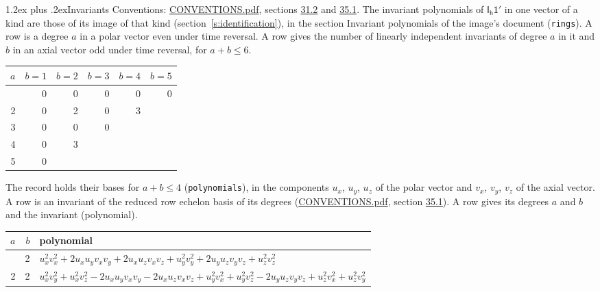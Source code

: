 \documentclass[10pt,a4paper]{article}
\makeatletter
\renewcommand\section{\@startsection{section}{1}{\z@}{-3ex plus -1ex minus -.2ex}%
  {1.2ex plus .2ex}{\normalfont\large\sffamily\bfseries\color{parttitle}}}
\numberwithin{equation}{section}
\newcommand{\grp}[1]{\mathsf{#1}}
\makeatother
\begin{document}
\section{Invariants}\label{s:invariants}
Conventions: \href{../../CONVENTIONS.pdf}{CONVENTIONS.pdf}, sections \href{../../CONVENTIONS.pdf\#conv.31.2}{31.2} and \href{../../CONVENTIONS.pdf\#conv.35.1}{35.1}.
The invariant polynomials of $\grp{I_{h}1'}$ in one vector of a kind are those of its image of that kind (section~\ref{s:identification}), in the section Invariant polynomials of the image's document (\texttt{rings}).
\leavevmode\label{n:index.degree.polar}\label{n:index.degree.axial}A row is a degree $a$ in a polar vector even under time reversal. A row gives the number of linearly independent invariants of degree $a$ in it and $b$ in an axial vector odd under time reversal, for $a + b \le 6$.
{\small\begin{longtable}{@{}rrrrrr@{}}\toprule
$a$ & $b = 1$ & $b = 2$ & $b = 3$ & $b = 4$ & $b = 5$\\\midrule\endhead
\bottomrule\endfoot\endlastfoot
1 & 0 & 0 & 0 & 0 & 0\\*
2 & 0 & 2 & 0 & 3 & \\*
3 & 0 & 0 & 0 &  & \\*
4 & 0 & 3 &  &  & \\*
5 & 0 &  &  &  & \\
\bottomrule\end{longtable}}
\leavevmode\label{n:local.component.polar}\label{n:local.component.axial}The record holds their bases for $a + b \le 4$ (\texttt{polynomials}), in the components $u_{x}$, $u_{y}$, $u_{z}$ of the polar vector and $v_{x}$, $v_{y}$, $v_{z}$ of the axial vector. \label{n:head.polynomial}A row is an invariant of the reduced row echelon basis of its degrees (\href{../../CONVENTIONS.pdf}{CONVENTIONS.pdf}, section \href{../../CONVENTIONS.pdf\#conv.35.1}{35.1}). A row gives its degrees $a$ and $b$ and the invariant (polynomial).
{\small\renewcommand{\arraystretch}{1.2}\begin{longtable}{@{}rrl@{}}\toprule
$a$ & $b$ & polynomial\\\midrule\endhead
\bottomrule\endfoot\endlastfoot
2 & 2 & $u_{x}^{2}v_{x}^{2} + 2u_{x}u_{y}v_{x}v_{y} + 2u_{x}u_{z}v_{x}v_{z} + u_{y}^{2}v_{y}^{2} + 2u_{y}u_{z}v_{y}v_{z} + u_{z}^{2}v_{z}^{2}$\\*
2 & 2 & $u_{x}^{2}v_{y}^{2} + u_{x}^{2}v_{z}^{2} - 2u_{x}u_{y}v_{x}v_{y} - 2u_{x}u_{z}v_{x}v_{z} + u_{y}^{2}v_{x}^{2} + u_{y}^{2}v_{z}^{2} - 2u_{y}u_{z}v_{y}v_{z} + u_{z}^{2}v_{x}^{2} + u_{z}^{2}v_{y}^{2}$\\
\bottomrule\end{longtable}}
\end{document}
